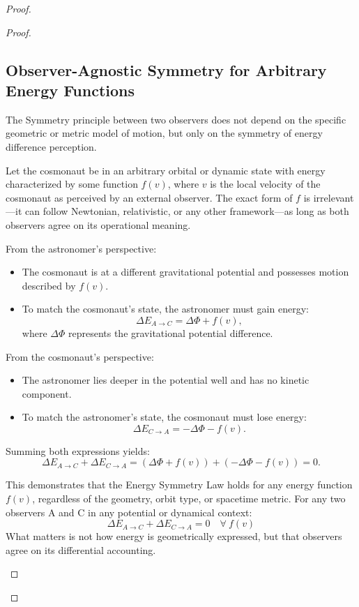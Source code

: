 \documentclass{article}
\begin{document}
\begin{proof}
\begin{proof}
\subsection{Observer-Agnostic Symmetry for Arbitrary Energy Functions}

The Symmetry principle between two observers does not depend on the specific geometric or metric model of motion, but only on the symmetry of energy difference perception.

Let the cosmonaut be in an arbitrary orbital or dynamic state with energy characterized by some function \( f(v) \), where \( v \) is the local velocity of the cosmonaut as perceived by an external observer. The exact form of \( f \) is irrelevant—it can follow Newtonian, relativistic, or any other framework—as long as both observers agree on its operational meaning.

From the astronomer's perspective:
\begin{itemize}
    \item The cosmonaut is at a different gravitational potential and possesses motion described by \( f(v) \).
    \item To match the cosmonaut's state, the astronomer must gain energy:
    \[
    \Delta E_{A \rightarrow C} = \Delta \Phi + f(v),
    \]
    where \( \Delta \Phi \) represents the gravitational potential difference.
\end{itemize}

From the cosmonaut's perspective:
\begin{itemize}
    \item The astronomer lies deeper in the potential well and has no kinetic component.
    \item To match the astronomer's state, the cosmonaut must lose energy:
    \[
    \Delta E_{C \rightarrow A} = -\Delta \Phi - f(v).
    \]
\end{itemize}

Summing both expressions yields:
\[
\Delta E_{A \rightarrow C} + \Delta E_{C \rightarrow A} = (\Delta \Phi + f(v)) + (-\Delta \Phi - f(v)) = 0.
\]

\begin{tcolorbox}[colback=gray!5, colframe=black!80!black, title=Geometric Independence]
This demonstrates that the Energy Symmetry Law holds for any energy function \( f(v) \), regardless of the geometry, orbit type, or spacetime metric. For any two observers A and C in any potential or dynamical context: 
\[
\boxed{
\Delta E_{A \rightarrow C} + \Delta E_{C \rightarrow A} = 0 \quad \forall \ f(v)
}
\]
What matters is not how energy is geometrically expressed, but that observers agree on its differential accounting.
\end{tcolorbox}


\end{proof}
\end{proof}
\end{document}
